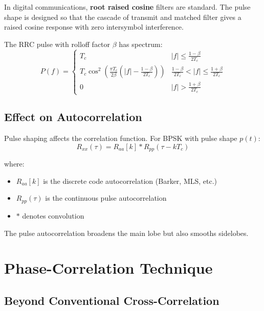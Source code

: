 \documentclass[11pt]{article}
\begin{document}
In digital communications, \textbf{root raised cosine} filters are standard. The pulse shape is designed so that the cascade of transmit and matched filter gives a raised cosine response with zero intersymbol interference.

The RRC pulse with rolloff factor $\beta$ has spectrum:
\begin{equation}
P(f) = \begin{cases}
T_c & |f| \leq \frac{1-\beta}{2T_c} \\
T_c \cos^2\left(\frac{\pi T_c}{2\beta}\left(|f| - \frac{1-\beta}{2T_c}\right)\right) & \frac{1-\beta}{2T_c} < |f| \leq \frac{1+\beta}{2T_c} \\
0 & |f| > \frac{1+\beta}{2T_c}
\end{cases}
\end{equation}

\subsection{Effect on Autocorrelation}

Pulse shaping affects the correlation function. For BPSK with pulse shape $p(t)$:
\begin{equation}
R_{xx}(\tau) = R_{aa}[k] * R_{pp}(\tau - kT_c)
\end{equation}

where:
\begin{itemize}
    \item $R_{aa}[k]$ is the discrete code autocorrelation (Barker, MLS, etc.)
    \item $R_{pp}(\tau)$ is the continuous pulse autocorrelation
    \item $*$ denotes convolution
\end{itemize}

The pulse autocorrelation broadens the main lobe but also smooths sidelobes.

\section{Phase-Correlation Technique}

\subsection{Beyond Conventional Cross-Correlation}
\end{document}
